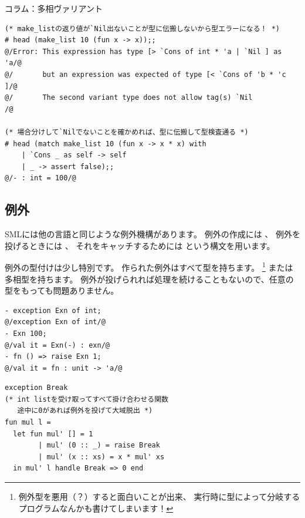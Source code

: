 \documentclass[11pt,a4paper]{jarticle}
\begin{document}
\begin{itembox}[l]{コラム：多相ヴァリアント}
\begin{lstlisting}[caption=多相ヴァリアントを用いたリスト構造(ocamlコード)]
(* make_listの返り値が`Nil出ないことが型に伝搬しないから型エラーになる！ *)
# head (make_list 10 (fun x -> x));;
@/Error: This expression has type [> `Cons of int * 'a | `Nil ] as 'a/@
@/       but an expression was expected of type [< `Cons of 'b * 'c ]/@
@/       The second variant type does not allow tag(s) `Nil          /@

(* 場合分けして`Nilでないことを確かめれば、型に伝搬して型検査通る *)
# head (match make_list 10 (fun x -> x * x) with
    | `Cons _ as self -> self
    | _ -> assert false);;
@/- : int = 100/@
\end{lstlisting}

\end{itembox}

\subsection{例外}

SMLには他の言語と同じような例外機構があります。
例外の作成には 、
例外を投げるときには 、
それをキャッチするためには
という構文を用います。

例外の型付けは少し特別です。
作られた例外はすべて型を持ちます。
\footnote{例外型を悪用（？）すると面白いことが出来、
実行時に型によって分岐するプログラムなんかも書けてしまいます！}
または多相型を持ちます。
例外が投げられれば処理を続けることもないので、任意の型をもっても問題ありません。

\begin{minipage}[htb]{0.4\linewidth}
\begin{lstlisting}[caption=例外の型付け]
- exception Exn of int;
@/exception Exn of int/@
- Exn 100;
@/val it = Exn(-) : exn/@
- fn () => raise Exn 1;
@/val it = fn : unit -> 'a/@
\end{lstlisting}
\end{minipage}
\hfill
\begin{minipage}[htb]{0.6\linewidth}
\begin{lstlisting}[caption=例外を用いたプログラム例]
exception Break
(* int listを受け取ってすべて掛け合わせる関数　
   途中に0があれば例外を投げて大域脱出 *)
fun mul l =
  let fun mul' [] = 1
        | mul' (0 :: _) = raise Break
        | mul' (x :: xs) = x * mul' xs
  in mul' l handle Break => 0 end
\end{lstlisting}
\end{minipage}
\end{document}
